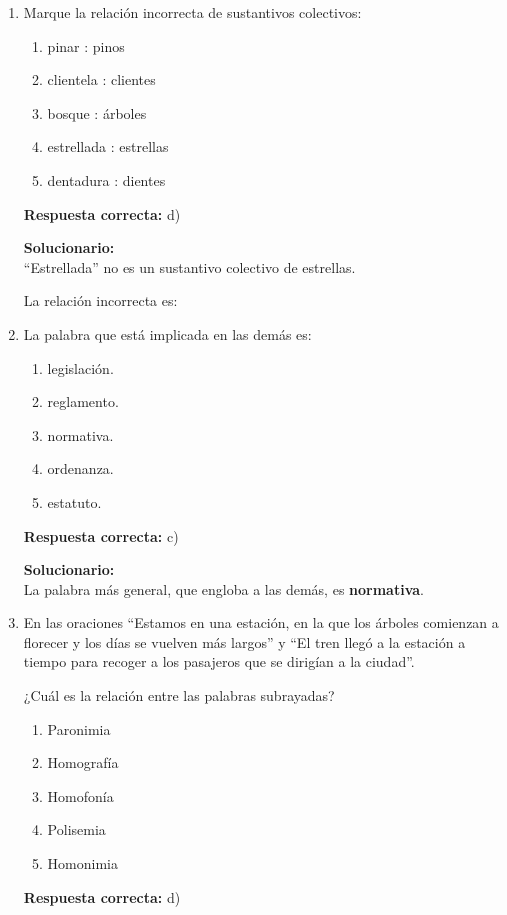 \begin{enumerate}
	
	\item Marque la relación incorrecta de sustantivos colectivos:
	\begin{enumerate}[label=\alph*)]
		\item pinar : pinos
		\item clientela : clientes
		\item bosque : árboles
		\item estrellada : estrellas
		\item dentadura : dientes
	\end{enumerate}
	\textbf{Respuesta correcta:} d)
	
	\vspace{2mm}
	\textbf{Solucionario:}\\
	``Estrellada'' no es un sustantivo colectivo de estrellas.
	
	La relación incorrecta es:
	
	
	\vspace{6mm}
	
	\item La palabra que está implicada en las demás es:
	\begin{enumerate}[label=\alph*)]
		\item legislación.
		\item reglamento.
		\item normativa.
		\item ordenanza.
		\item estatuto.
	\end{enumerate}
	\textbf{Respuesta correcta:} c)
	
	\vspace{2mm}
	\textbf{Solucionario:}\\
	La palabra más general, que engloba a las demás, es \textbf{normativa}.
	
	\vspace{6mm}
	
	\item En las oraciones ``Estamos en una estación, en la que los árboles comienzan a florecer y los días se vuelven más largos'' y ``El tren llegó a la estación a tiempo para recoger a los pasajeros que se dirigían a la ciudad''.
	
	¿Cuál es la relación entre las palabras subrayadas?
	\begin{enumerate}[label=\alph*)]
		\item Paronimia
		\item Homografía
		\item Homofonía
		\item Polisemia
		\item Homonimia
	\end{enumerate}
	\textbf{Respuesta correcta:} d)
	

\end{enumerate}
